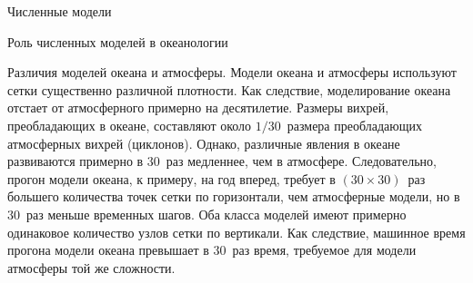 \begin{chapter}{Численные модели}
\begin{section}{Роль численных моделей в океанологии}
\begin{paragraph}{Различия моделей океана и атмосферы.}
Модели океана и атмосферы используют сетки существенно различной плотности.
Как следствие, моделирование океана отстает от атмосферного примерно на
десятилетие. Размеры вихрей, преобладающих в океане, составляют 
около $1/30$~размера преобладающих атмосферных вихрей (циклонов). 
Однако, различные явления в океане развиваются примерно в $30$~раз медленнее, 
чем в атмосфере. Следовательно, прогон модели океана, к примеру, на год вперед,
требует в $(30 \times 30 )$~раз большего количества точек сетки по горизонтали,
чем атмосферные модели, но в $30$~раз меньше временных шагов. Оба класса
моделей имеют примерно одинаковое количество узлов сетки по вертикали. 
Как следствие, машинное время прогона модели океана превышает в $30$~раз 
время, требуемое для модели атмосферы той же сложности.
% 
\end{paragraph}
\end{section}


\end{chapter}
